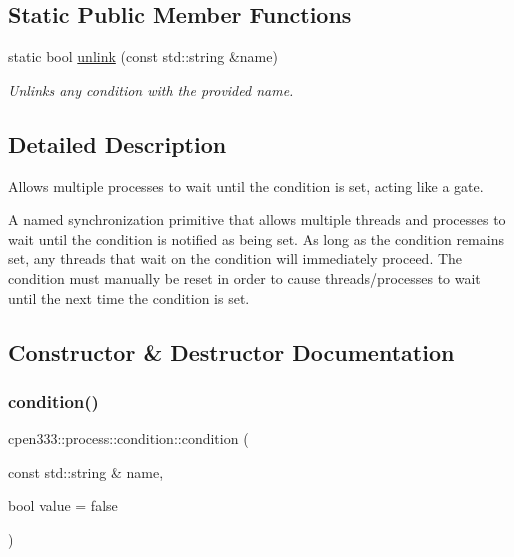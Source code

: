 \subsection*{Static Public Member Functions}
\begin{DoxyCompactItemize}
\item 
static bool \hyperlink{classcpen333_1_1process_1_1condition_aaffc8df542fb4e2aecdc1056217a4284}{unlink} (const std\+::string \&name)
\begin{DoxyCompactList}\small\item\em Unlinks any condition with the provided name. \end{DoxyCompactList}\end{DoxyCompactItemize}


\subsection{Detailed Description}
Allows multiple processes to wait until the condition is set, acting like a gate. 

A named synchronization primitive that allows multiple threads and processes to wait until the condition is notified as being set. As long as the condition remains set, any threads that wait on the condition will immediately proceed. The condition must manually be reset in order to cause threads/processes to wait until the next time the condition is set. 

\subsection{Constructor \& Destructor Documentation}
\mbox{\label{classcpen333_1_1process_1_1condition_a584deae08b94a2f6a49abca119183571}} 
\subsubsection{\texorpdfstring{condition()}{condition()}}
{\footnotesize\ttfamily cpen333\+::process\+::condition\+::condition (\begin{DoxyParamCaption}\item[{const std\+::string \&}]{name,  }\item[{bool}]{value = {\ttfamily false} }\end{DoxyParamCaption})\hspace{0.3cm}{\ttfamily [inline]}}



